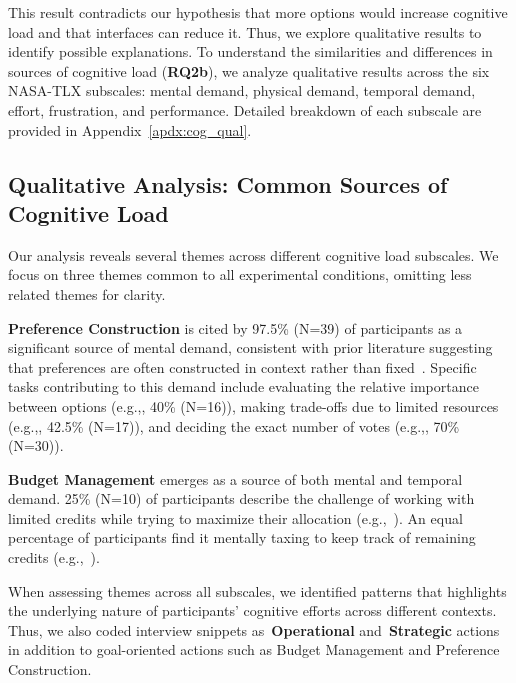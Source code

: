 This result contradicts our hypothesis that more options would increase cognitive load and that interfaces can reduce it. Thus, we explore qualitative results to identify possible explanations. To understand the similarities and differences in sources of cognitive load (\textbf{RQ2b}), we analyze qualitative results across the six NASA-TLX subscales: mental demand, physical demand, temporal demand, effort, frustration, and performance. Detailed breakdown of each subscale are provided in Appendix~\ref{apdx:cog_qual}.

\subsection{Qualitative Analysis: Common Sources of Cognitive Load}
\label{sec:cog_common}
Our analysis reveals several themes across different cognitive load subscales. We focus on three themes common to all experimental conditions, omitting less related themes for clarity.

\textbf{Preference Construction} is cited by 97.5\% (N=39) of participants as a significant source of mental demand, consistent with prior literature suggesting that preferences are often constructed in context rather than fixed~\cite{lichtensteinConstructionPreference2006}. Specific tasks contributing to this demand include evaluating the relative importance between options (e.g.,, 40\% (N=16)), making trade-offs due to limited resources (e.g.,, 42.5\% (N=17)), and deciding the exact number of votes (e.g.,, 70\% (N=30)).

\textbf{Budget Management} emerges as a source of both mental and temporal demand. 25\% (N=10) of participants describe the challenge of working with limited credits while trying to maximize their allocation (e.g.,~). An equal percentage of participants find it mentally taxing to keep track of remaining credits (e.g.,~).

When assessing themes across all subscales, we identified patterns that highlights the underlying nature of participants' cognitive efforts across different contexts. Thus, we also coded interview snippets as~\textbf{Operational} and~\textbf{Strategic} actions in addition to goal-oriented actions such as Budget Management and Preference Construction.

